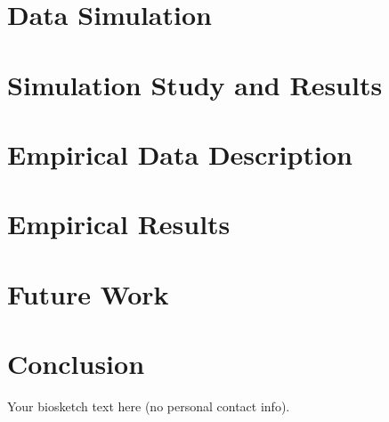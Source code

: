 \documentclass[11pt,expanded,copyright]{template/fsuthesis}
\begin{document}
\chapter{Data Simulation}


\chapter{Simulation Study and Results}

\chapter{Empirical Data Description}


\chapter{Empirical Results}

\chapter{Future Work}


\chapter{Conclusion}

\renewcommand*{\bibname}{References}
\printbibliography

\begin{biosketch}
Your biosketch text here (no personal contact info).
\end{biosketch}
\end{document}
